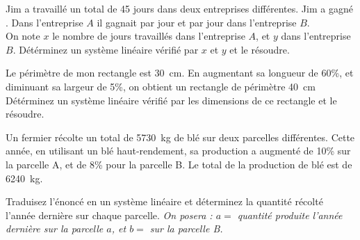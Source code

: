 \documentclass[main.tex]{subfiles}
\begin{document}
\begin{exercise}\hfill 
	
\noindent Jim a travaillé un total de 45 jours dans deux entreprises différentes. Jim a gagné . Dans l'entreprise $A$ il gagnait  par jour et  par jour dans l'entreprise $B$.\\
\noindent On note $x$ le nombre de jours travaillés dans l'entreprise $A$, et $y$ dans l'entreprise $B$. Détérminez un système linéaire vérifié par $x$ et $y$ et le résoudre.
\end{exercise} 
\begin{exercise}\hfill 

\noindent Le périmètre de mon rectangle est \SI{30}{\centi\meter}. En augmentant sa longueur de 60\%, et diminuant sa largeur de 5\%, on obtient un rectangle de périmètre \SI{40}{\centi\meter}\\
 \noindent Détérminez un système linéaire vérifié par les dimensions de ce rectangle et le résoudre.
\end{exercise} 
\newpage
\begin{exercise}\hfill 
	
	\noindent Un fermier récolte un total de \SI{5730}{\kilo\gram} de blé sur deux parcelles différentes. Cette année, en utilisant un blé haut-rendement, sa production a augmenté de 10\% sur la parcelle A, et de 8\% pour la parcelle B. Le total de la production de blé est de \SI{6240}{\kilo\gram}.
	
	\noindent Traduisez l'énoncé en un système linéaire et déterminez la quantité récolté l'année dernière sur chaque parcelle.  
	\emph{On posera : $a=$ quantité produite l'année dernière sur la parcelle $a$,  et $b=$ sur la parcelle B.}
\end{exercise} 
\end{document}
